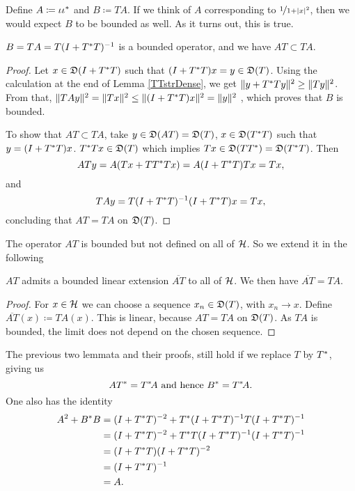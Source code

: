 Define $A \coloneqq \iota \iota ^{*}$ and $B \coloneqq TA$. 
If we think of $A$ corresponding to $\nicefrac{1}{1 + |x|^2}$, then we would expect
$B$ to be bounded as well.
As it turns out, this is true.
\begin{lem}\label{BBounded}
 $B = TA = T(I + T ^{*} T)^{-1}$ is a bounded operator, and we have
 $AT \subset TA$.
\end{lem}



\begin{proof}
 Let $x \in \mathfrak{D}(I + T ^{*} T)$ such that $(I + T ^{*} T)x = y \in \mathfrak{D}(T)$.
 Using the calculation at the end of Lemma \ref{TTstrDense}, we get 
 $\| y + T^{*} T y \|^2 \geq \|Ty\|^2$.
From that, $\| TAy\|^2 = \| Tx \| ^2 \leq \| (I + T ^{*} T)x \|^2 = \| y \| ^2$
, which proves that $B$ is bounded. 

To show that $AT \subset TA$, take $y \in \mathfrak{D}(AT) = \mathfrak{D}(T)$,
$x \in \mathfrak{D}(T ^{*} T)$ such that $y = ( I +  T ^{*} T)x$. $T ^{*} T x \in \mathfrak{D}(T)$
which implies $Tx \in \mathfrak{D}(TT^{*}) = \mathfrak{D}(T^{*} T)$. Then 
\[
 ATy = A(Tx + T T^{*} T x) = A(I + T^{*} T)Tx= Tx,
\]
and
\[
 TAy= T(I+ T^{*} T)^{-1} (I + T ^{*} T)x=Tx,
\]
concluding that $AT = TA$ on $\mathfrak{D}(T)$.

\end{proof}

The operator $AT$ is bounded but not defined on all of $\mathcal{H}$. So we extend it
in the following

\begin{lem}
 $AT$ admits a bounded linear extension $\overline{AT}$ to all of $\mathcal{H}$. 
 We then have $\overline{AT}=TA$.
\end{lem}

\begin{proof}
 For $x \in \mathcal{H}$ we can choose a sequence $x_n \in \mathfrak{D}(T)$, with 
 $x_n \rightarrow x$. Define $\overline{AT}(x) \coloneqq TA(x)$.
 This is linear, because $AT = TA$ on $\mathfrak{D}(T)$. As $TA$ is bounded,
 the limit does not depend on the chosen sequence.
\end{proof}

\begin{rem}
 The previous two lemmata and their proofs, still hold if we replace $T$ by $T^{*}$,
 giving us 
 \[
  AT^{*} = T^{*} \! A \text{ and hence } B^{*} = T^{*} \! A.
 \]
 One also has the identity
 \begin{align*}
  A^2 + B^{*} B &= (I + T^{*} T)^{-2} + T ^{*} (I + T^{*} T)
		    ^{-1} T (I + T^{*} T) ^{-1} \\
		&= (I + T^{*} T)^{-2} + T ^{*} T(I + T^{*} T)
		   ^{-1} (I + T^{*} T) ^{-1} \\
		&= (I + T^{*} T)(I + T^{*} T)^{-2} \\
		&= (I + T^{*} T)^{-1}  \\
		&= A .
  \end{align*}

  

\end{rem}

